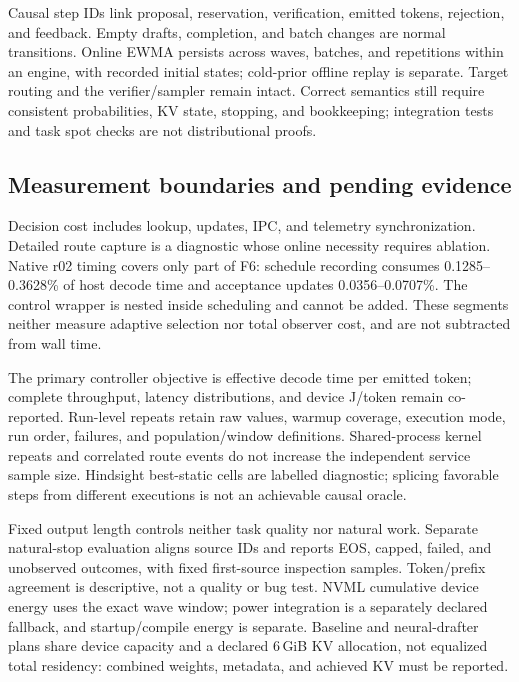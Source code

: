 \documentclass[conference,letterpaper]{IEEEtran}
\begin{document}
Causal step IDs link proposal, reservation, verification, emitted tokens, rejection, and feedback. Empty drafts, completion, and batch changes are normal transitions. Online EWMA persists across waves, batches, and repetitions within an engine, with recorded initial states; cold-prior offline replay is separate. Target routing and the verifier/sampler remain intact. Correct semantics still require consistent probabilities, KV state, stopping, and bookkeeping; integration tests and task spot checks are not distributional proofs.

\subsection{Measurement boundaries and pending evidence}
Decision cost includes lookup, updates, IPC, and telemetry synchronization. Detailed route capture is a diagnostic whose online necessity requires ablation. Native r02 timing covers only part of F6: schedule recording consumes 0.1285--0.3628\% of host decode time and acceptance updates 0.0356--0.0707\%. The control wrapper is nested inside scheduling and cannot be added. These segments neither measure adaptive selection nor total observer cost, and are not subtracted from wall time.

The primary controller objective is effective decode time per emitted token; complete throughput, latency distributions, and device J/token remain co-reported. Run-level repeats retain raw values, warmup coverage, execution mode, run order, failures, and population/window definitions. Shared-process kernel repeats and correlated route events do not increase the independent service sample size. Hindsight best-static cells are labelled diagnostic; splicing favorable steps from different executions is not an achievable causal oracle.

Fixed output length controls neither task quality nor natural work. Separate natural-stop evaluation aligns source IDs and reports EOS, capped, failed, and unobserved outcomes, with fixed first-source inspection samples. Token/prefix agreement is descriptive, not a quality or bug test. NVML cumulative device energy uses the exact wave window; power integration is a separately declared fallback, and startup/compile energy is separate. Baseline and neural-drafter plans share device capacity and a declared 6\,GiB KV allocation, not equalized total residency: combined weights, metadata, and achieved KV must be reported.
\end{document}
